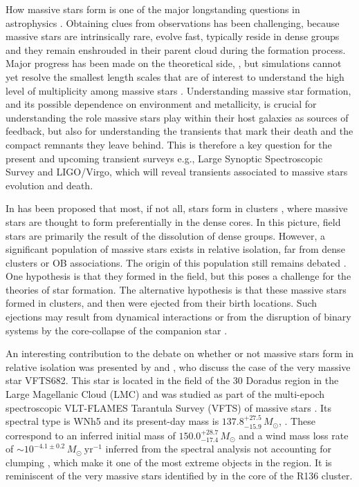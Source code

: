\documentclass[apjl,twocolumn]{emulateapj}
\newcommand{\todo}[1]{{\large $\blacksquare$~\textbf{\color{red}[#1]}}~$\blacksquare$}
\begin{document}
How massive stars form is one of the major longstanding questions in astrophysics
\citep[e.g.,][]{zinnecker:07}. Obtaining clues from observations has been challenging, because massive stars are intrinsically rare, 
evolve fast, typically reside in dense groups and they remain enshrouded in their parent cloud during the formation
process.  Major progress has been made on the theoretical side,
\citep[e.g.][]{kuiper:15,rosen:16}, but simulations cannot yet resolve
the smallest length scales that are of interest to understand the 
high level of multiplicity among massive stars  \citep[e.g.,][]{bate:09, sana:17}.  Understanding massive star formation, and its
possible dependence on environment and metallicity, is crucial for
understanding the role massive stars play within their host galaxies
as sources of feedback, but also for understanding the transients that
mark their death and the compact remnants they leave behind.  This is
therefore a key question for the present and upcoming transient
surveys e.g., Large Synoptic Spectroscopic Survey and LIGO/Virgo,
which  will reveal transients associated to massive stars
evolution and death.

In has been proposed that most, if not all, stars form in clusters \citep{lada:03}, where massive stars are thought to  form preferentially in the dense cores. In this picture, field stars are primarily the result of the dissolution of dense groups. 
However, a significant population of massive stars exists in relative
isolation,  far from dense clusters or OB associations. The origin of
this population still remains debated \citep{lamb:16,ward:18}.   One
hypothesis is that they  formed in the field, but this poses a
challenge for the theories of star formation. The alternative
hypothesis is that these massive stars formed in clusters, and then
were ejected from their birth locations. Such ejections may result
from dynamical interactions \citep[e.g.,][]{poveda:67} or from the disruption of binary systems by the core-collapse of the companion star \citep[e.g.,][]{zwicky:57, blaauw:61}. 
 
An interesting contribution to the debate on whether or not massive
stars form in relative isolation was presented by
\cite{bestenlehner:11} and \cite{bressert:12}, who discuss the case of the very massive star
VFTS682.   This star is located in the field of the 30 Doradus region
in the Large Magellanic Cloud (LMC) and was studied as part of the
multi-epoch spectroscopic VLT-FLAMES Tarantula Survey (VFTS) of
massive stars \citep{evans:11}.  Its spectral type is WNh5 and its 
present-day mass is $137.8^{+27.5}_{-15.9}\,M_\odot$,
\citep{schneider:18}. These correspond to an inferred initial mass of
$150.0^{+28.7}_{-17.4}\,M_\odot$ and a wind mass loss rate of
$\sim10^{-4.1\pm0.2}\,M_\odot \ \mathrm{yr}^{-1}$ inferred from the
spectral analysis not accounting for clumping
\citep[][]{bestenlehner:11}, which make it one of the
most extreme objects in the region.  It is reminiscent of the very
massive stars %
identified by
\citet{crowther:10, crowther:16} in the core of the
R136 cluster. 
 
\end{document}
